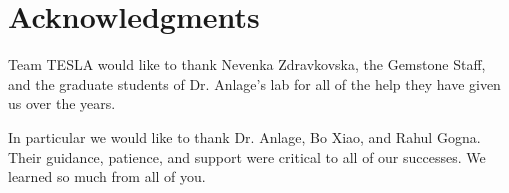 \newpage
\section*{Acknowledgments}

Team TESLA would like to thank Nevenka Zdravkovska, the Gemstone Staff, and the graduate students of Dr. Anlage's lab for all of the help they have given us over the years.

In particular we would like to thank Dr. Anlage, Bo Xiao, and Rahul Gogna.  Their guidance, patience, and support were critical to all of our successes.  We learned so much from all of you.

